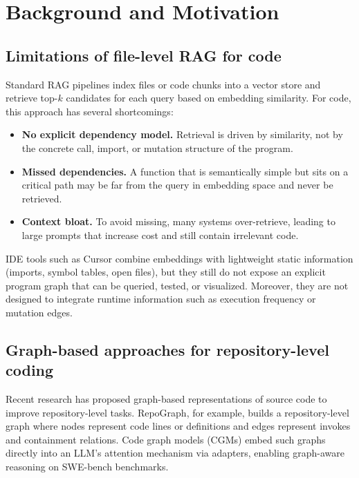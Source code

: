 \documentclass[11pt]{article}
\begin{document}
\section{Background and Motivation}

\subsection{Limitations of file-level RAG for code}

Standard RAG pipelines index files or code chunks into a vector store and retrieve top-$k$ candidates for each query based on embedding similarity.
For code, this approach has several shortcomings:
\begin{itemize}
  \item \textbf{No explicit dependency model.} Retrieval is driven by similarity, not by the concrete call, import, or mutation structure of the program.
  \item \textbf{Missed dependencies.} A function that is semantically simple but sits on a critical path may be far from the query in embedding space and never be retrieved.
  \item \textbf{Context bloat.} To avoid missing, many systems over-retrieve, leading to large prompts that increase cost and still contain irrelevant code.
\end{itemize}

IDE tools such as Cursor combine embeddings with lightweight static information (imports, symbol tables, open files), but they still do not expose an explicit program graph that can be queried, tested, or visualized.
Moreover, they are not designed to integrate runtime information such as execution frequency or mutation edges.

\subsection{Graph-based approaches for repository-level coding}

Recent research has proposed graph-based representations of source code to improve repository-level tasks.
RepoGraph, for example, builds a repository-level graph where nodes represent code lines or definitions and edges represent invokes and containment relations.
Code graph models (CGMs) embed such graphs directly into an LLM's attention mechanism via adapters, enabling graph-aware reasoning on SWE-bench benchmarks.
\end{document}

